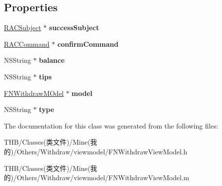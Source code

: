 \subsection*{Properties}
\begin{DoxyCompactItemize}
\item 
\mbox{\label{interface_f_n_withdraw_view_model_a02e86e538d18805bf24c727e5b1c27ac}} 
\mbox{\hyperlink{interface_r_a_c_subject}{R\+A\+C\+Subject}} $\ast$ {\bfseries success\+Subject}
\item 
\mbox{\label{interface_f_n_withdraw_view_model_a1f6bc6581f048aeb3d9fcb6efc8ed5fd}} 
\mbox{\hyperlink{interface_r_a_c_command}{R\+A\+C\+Command}} $\ast$ {\bfseries confirm\+Command}
\item 
\mbox{\label{interface_f_n_withdraw_view_model_acf2a66a0f4525baf4d30640239f87b74}} 
N\+S\+String $\ast$ {\bfseries balance}
\item 
\mbox{\label{interface_f_n_withdraw_view_model_abeec72016c07c04d5bc746ed8a456fde}} 
N\+S\+String $\ast$ {\bfseries tips}
\item 
\mbox{\label{interface_f_n_withdraw_view_model_adfde2b775e09e5c15e37a69c4d4b7095}} 
\mbox{\hyperlink{interface_f_n_withdraw_m_odel}{F\+N\+Withdraw\+M\+Odel}} $\ast$ {\bfseries model}
\item 
\mbox{\label{interface_f_n_withdraw_view_model_a41f87b1c7d94a77fe93b00be22492e13}} 
N\+S\+String $\ast$ {\bfseries type}
\end{DoxyCompactItemize}


The documentation for this class was generated from the following files\+:\begin{DoxyCompactItemize}
\item 
T\+H\+B/\+Classes(类文件)/\+Mine(我的)/\+Others/\+Withdraw/viewmodel/F\+N\+Withdraw\+View\+Model.\+h\item 
T\+H\+B/\+Classes(类文件)/\+Mine(我的)/\+Others/\+Withdraw/viewmodel/F\+N\+Withdraw\+View\+Model.\+m\end{DoxyCompactItemize}
